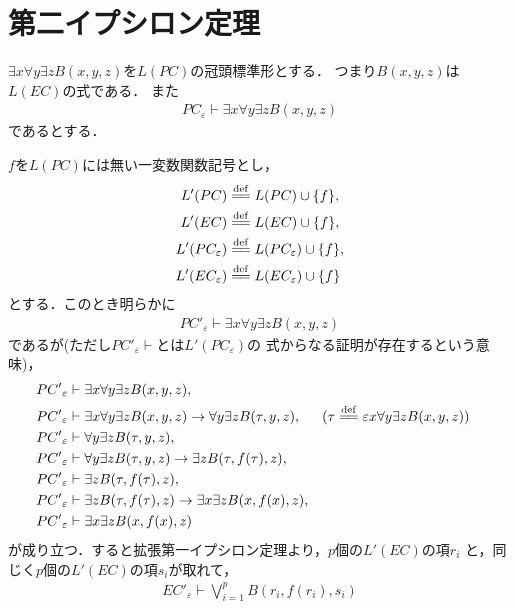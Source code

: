 \section{第二イプシロン定理}
	$\exists x \forall y \exists z B(x,y,z)$を$L(PC)$の冠頭標準形とする．
	つまり$B(x,y,z)$は$L(EC)$の式である．
	また
	\begin{align}
		PC_{\varepsilon} \vdash \exists x \forall y \exists z B(x,y,z)
	\end{align}
	であるとする．
	
	$f$を$L(PC)$には無い一変数関数記号とし，
	\begin{align}
		L'(PC) &\defeq L(PC) \cup \{f\}, \\
		L'(EC) &\defeq L(EC) \cup \{f\}, \\
		L'(PC_{\varepsilon}) &\defeq L(PC_{\varepsilon}) \cup \{f\}, \\
		L'(EC_{\varepsilon}) &\defeq L(EC_{\varepsilon}) \cup \{f\}
	\end{align}
	とする．このとき明らかに
	\begin{align}
		{PC'}_{\varepsilon} \vdash \exists x \forall y \exists z B(x,y,z)
	\end{align}
	であるが(ただし${PC'}_{\varepsilon} \vdash$とは$L'(PC_{\varepsilon})$の
	式からなる証明が存在するという意味)，
	\begin{align}
		{PC'}_{\varepsilon} &\vdash \exists x \forall y \exists z B(x,y,z), \\
		{PC'}_{\varepsilon} &\vdash \exists x \forall y \exists z B(x,y,z)
		\rightarrow \forall y \exists z B(\tau,y,z), && 
		(\tau \defeq \varepsilon x \forall y \exists z B(x,y,z)) \\
		{PC'}_{\varepsilon} &\vdash \forall y \exists z B(\tau,y,z), \\
		{PC'}_{\varepsilon} &\vdash \forall y \exists z B(\tau,y,z)
		\rightarrow \exists z B(\tau,f(\tau),z), \\
		{PC'}_{\varepsilon} &\vdash \exists z B(\tau,f(\tau),z), \\
		{PC'}_{\varepsilon} &\vdash \exists z B(\tau,f(\tau),z)
		\rightarrow \exists x \exists z B(x,f(x),z), \\
		{PC'}_{\varepsilon} &\vdash \exists x \exists z B(x,f(x),z)
	\end{align}
	が成り立つ．すると拡張第一イプシロン定理より，$p$個の$L'(EC)$の項$r_{i}$
	と，同じく$p$個の$L'(EC)$の項$s_{i}$が取れて，
	\begin{align}
		{EC'}_{\varepsilon} \vdash \bigvee_{i=1}^{p} B(r_{i},f(r_{i}),s_{i})
	\end{align}
